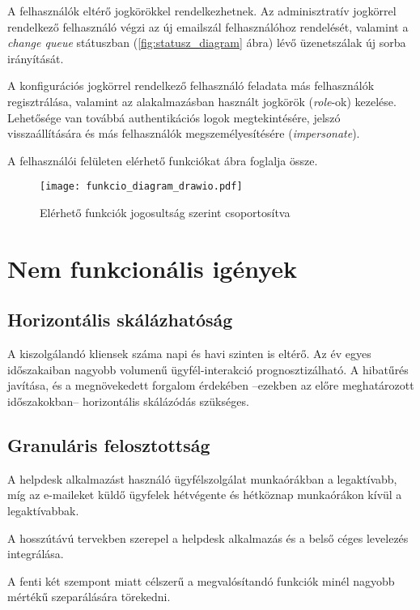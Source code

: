 A felhasználók eltérő jogkörökkel rendelkezhetnek. Az adminisztratív jogkörrel rendelkező felhasználó végzi az új emailszál felhasználóhoz rendelését, valamint a \foreignlanguage{british}{\textit{change queue}} státuszban (\ref{fig:statusz_diagram} ábra) lévő üzenetszálak új sorba irányítását.

A konfigurációs jogkörrel rendelkező felhasználó feladata más felhasználók regisztrálása, valamint az alakalmazásban használt jogkörök (\foreignlanguage{british}{\textit{role}}-ok) kezelése. Lehetősége van továbbá authentikációs logok megtekintésére, jelszó visszaállítására és más felhasználók megszemélyesítésére (\foreignlanguage{british}{\textit{impersonate}}).

A felhasználói felületen elérhető funkciókat  ábra foglalja össze.

\begin{figure}[hbt] 
	\centering
	\texttt{[image: funkcio\_diagram\_drawio.pdf]}
	\caption{Elérhető funkciók jogosultság szerint csoportosítva}\label{fig:funkcio_diagram}
\end{figure}


\section{Nem funkcionális igények}	


\subsection[Skálázhatóság]{Horizontális skálázhatóság}
A kiszolgálandó kliensek száma napi és havi szinten is eltérő. Az év egyes időszakaiban nagyobb volumenű ügyfél-interakció prognosztizálható. A hibatűrés javítása, és a megnövekedett forgalom érdekében --ezekben az előre meghatározott időszakokban-- horizontális skálázódás szükséges.


\subsection{Granuláris felosztottság}
A \foreignlanguage{british}{helpdesk} alkalmazást használó ügyfélszolgálat munkaórákban a legaktívabb, míg az e-maileket küldő ügyfelek hétvégente és hétköznap munkaórákon kívül a legaktívabbak.

A hosszútávú tervekben szerepel a \foreignlanguage{british}{helpdesk} alkalmazás és a belső céges levelezés integrálása.

A fenti két szempont miatt célszerű a megvalósítandó funkciók minél nagyobb mértékű szeparálására törekedni.



